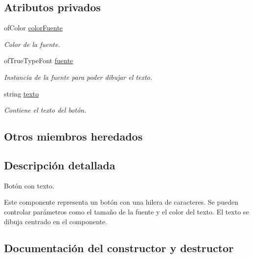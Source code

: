 \subsection*{Atributos privados}
\begin{DoxyCompactItemize}
\item 
of\+Color \hyperlink{classboton_simple_a675afe5f4260c740b013c84dff6e60e1}{color\+Fuente}
\begin{DoxyCompactList}\small\item\em Color de la fuente. \end{DoxyCompactList}\item 
of\+True\+Type\+Font \hyperlink{classboton_simple_aca3777162256e66600ed386b887e4414}{fuente}
\begin{DoxyCompactList}\small\item\em Instancia de la fuente para poder dibujar el texto. \end{DoxyCompactList}\item 
string \hyperlink{classboton_simple_a6093d1fa34187d1f74182f59de6459b9}{texto}
\begin{DoxyCompactList}\small\item\em Contiene el texto del botón. \end{DoxyCompactList}\end{DoxyCompactItemize}
\subsection*{Otros miembros heredados}


\subsection{Descripción detallada}
Botón con texto. 

Este componente representa un botón con una hilera de caracteres. Se pueden controlar parámetros como el tamaño de la fuente y el color del texto. El texto se dibuja centrado en el componente. 

\subsection{Documentación del constructor y destructor}
\hypertarget{classboton_simple_acbcb5c2f8c673c1de738a2282fdca5de}{}
